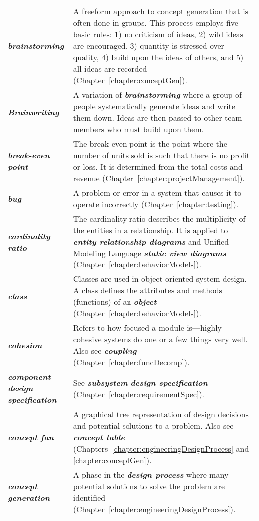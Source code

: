\begin{longtable} { p{3cm} p{11cm}}
\emph{\textbf{brainstorming}} & A freeform approach to concept
generation that is often done in groups. This process employs five basic
rules: 1) no criticism of ideas, 2) wild ideas are encouraged, 3)
quantity is stressed over quality, 4) build upon the ideas of others,
and 5) all ideas are recorded (Chapter~\ref{chapter:conceptGen}). \B \\
\emph{\textbf{Brainwriting}} & A variation of
\emph{\textbf{brainstorming}} where a group of people systematically
generate ideas and write them down. Ideas are then passed to other team
members who must build upon them. \B \\
\emph{\textbf{break-even point}} & The break-even point is the point
where the number of units sold is such that there is no profit or loss.
It is determined from the total costs and revenue (Chapter~\ref{chapter:projectManagement}). \B \\
\emph{\textbf{bug}} & A problem or error in a system that causes it to
operate incorrectly (Chapter~\ref{chapter:testing}). \B \\
\emph{\textbf{cardinality ratio}} & The cardinality ratio describes the
multiplicity of the entities in a relationship. It is applied to
\emph{\textbf{entity relationship diagrams}} and Unified Modeling
Language \emph{\textbf{static view diagrams}} (Chapter~\ref{chapter:behaviorModels}). \B \\
\emph{\textbf{class}} & Classes are used in object-oriented system
design. A class defines the attributes and methods (functions) of an
\emph{\textbf{object}} (Chapter~\ref{chapter:behaviorModels}). \B \\
\emph{\textbf{cohesion}} & Refers to how focused a module is---highly
cohesive systems do one or a few things very well. Also see
\emph{\textbf{coupling}} (Chapter~\ref{chapter:funcDecomp}). \B \\
\emph{\textbf{component design specification}} & See
\emph{\textbf{subsystem design specification}} (Chapter~\ref{chapter:requirementSpec}). \B \\
\emph{\textbf{concept fan}} & A graphical tree representation of design
decisions and potential solutions to a problem. Also see
\emph{\textbf{concept table}} (Chapters~\ref{chapter:engineeringDesignProcess} and 
\ref{chapter:conceptGen}). \B \\
\emph{\textbf{concept generation}} & A phase in the \emph{\textbf{design
process}} where many potential solutions to solve the problem are
identified (Chapter~\ref{chapter:engineeringDesignProcess}). \B \\

\end{longtable}
